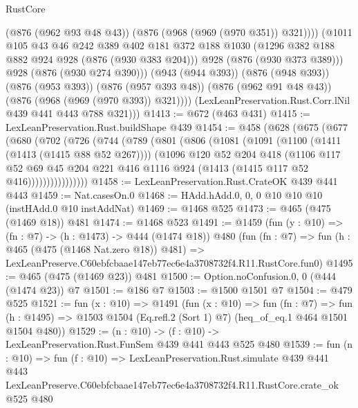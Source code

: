 \begin{lexlean}{RustCore}
\begin{coremodule}
                  (@876 (@962 @93 @48 @43))
                  (@876 (@968 (@969 (@970 @351)) @321))))
              (@1011
                @105
                @43
                @46
                @242
                @389
                @402
                @181
                @372
                @188
                @1030
                (@1296 @382 @188 @882 @924 @928 (@876 (@930 @383 @204)))
                @928
                (@876 (@930 @373 @389)))
              @928
              (@876 (@930 @274 @390)))
            (@943 (@944 @393))
            (@876 (@948 @393))
            (@876 (@953 @393))
            (@876 (@957 @393 @48))
            (@876 (@962 @91 @48 @43))
            (@876 (@968 (@969 (@970 @393)) @321))))
        (LexLeanPreservation.Rust.Corr.lNil @439 @441 @443 @788 @321)))
@1413 := @672 (@463 @431)
@1415 := LexLeanPreservation.Rust.buildShape @439
@1454 := @458
    (@628
      (@675
        (@677
          (@680
            (@702
              (@726
                (@744
                  (@789
                    (@801
                      (@806
                        (@1081
                          (@1091
                            (@1100 (@1411 (@1413 (@1415 @88 @52 @267))))
                            (@1096
                              @120
                              @52
                              @204
                              @418
                              (@1106
                                @117
                                @52
                                @69
                                @45
                                @204
                                @221
                                @416
                                @1116
                                @924
                                (@1413 (@1415 @117 @52 @416))))))))))))))))
@1458 := LexLeanPreservation.Rust.CrateOK @439 @441 @443
@1459 := Nat.casesOn.{0}
@1468 := HAdd.hAdd.{0, 0, 0} @10 @10 @10 (instHAdd.{0} @10 instAddNat)
@1469 := @1468 @525
@1473 := @465 (@475 (@1469 @18)) @481
@1474 := @1468 @523
@1491 := @1459
    (fun (y : @10) => (fn : @7) -> (h : @1473) -> @444 (@1474 @18))
    @480
    (fun (fn : @7) =>
    fun (h : @465 (@475 (@1468 Nat.zero @18)) @481) =>
    LexLeanPreserve.C60ebfcbaae147eb77ec6e4a3708732f4.R11.RustCore.fun0)
@1495 := @465 (@475 (@1469 @23)) @481
@1500 := Option.noConfusion.{0, 0} (@444 (@1474 @23)) @7
@1501 := @186 @7
@1503 := @1500 @1501 @7
@1504 := @479 @525
@1521 := fun (x : @10) =>
  @1491
    (fun (x : @10) =>
    fun (fn : @7) =>
    fun (h : @1495) => @1503 @1504 (Eq.refl.{2} (Sort 1) @7) (heq_of_eq.{1} @464 @1501 @1504 @480))
@1529 := (n : @10) -> (f : @10) -> LexLeanPreservation.Rust.FunSem @439 @441 @443 @525 @480
@1539 := fun (n : @10) =>
  fun (f : @10) =>
  LexLeanPreservation.Rust.simulate
    @439
    @441
    @443
    LexLeanPreserve.C60ebfcbaae147eb77ec6e4a3708732f4.R11.RustCore.crate_ok
    @525
    @480
\end{coremodule}
\end{lexlean}
